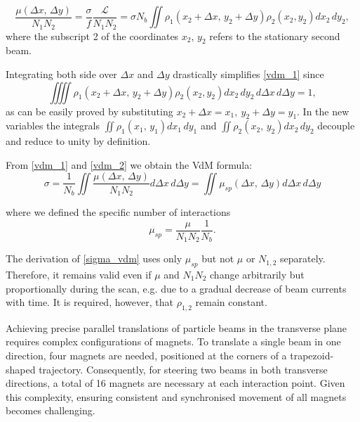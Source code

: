 \begin{equation}
\frac{\mu (\Delta x,\, \Delta y)}{N_1N_2} = \frac{\sigma}{f} \frac{\mathcal{L}}{N_1N_2} = \sigma N_b \iint \rho _1(x_2 + \Delta x,\, y_2 + \Delta y) \rho _2(x_2,y_2) dx_2\, dy_2, \label{vdm_1}
\end{equation}
where the subscript 2 of the coordinates $x_2$, $y_2$ refers to the stationary second beam.

Integrating both side over $\Delta x$ and $\Delta y$ drastically simplifies \eqref{vdm_1} since
\begin{equation} \iiiint \rho _1(x_2 {+} \Delta x,\, y_2 {+} \Delta y) \rho _2(x_2,y_2) dx_2\, dy_2\, d\Delta x\, d\Delta y {=} 1, \label{vdm_2} \end{equation}
as can be easily proved by substituting $x_2+\Delta x=x_1,\ y_2+\Delta y=y_1$. In the new variables the integrals $\iint \rho _1(x_1,\, y_1)dx_1\,dy_1$ and $\iint \rho _2(x_2,\, y_2)dx_2\,dy_2$ decouple and reduce to unity by definition.

From \eqref{vdm_1} and \eqref{vdm_2} we obtain the VdM formula:
\begin{equation}
     \sigma = \frac{1}{N_b} \iint \frac{\mu (\Delta x,\, \Delta y)}{N_1N_2} d\Delta x\, d\Delta y= \iint \mu_{sp}(\Delta x,\, \Delta y)d\Delta x\, d \Delta y \label{sigma_vdm}
    \end{equation}

where we defined the specific number of interactions
\begin{equation}
\mu_{sp}=\frac{\mu}{N_1 N_2}\frac{1}{N_b}.\label{mu_sp}
\end{equation}

The derivation of \eqref{sigma_vdm} uses only $\mu _{sp}$ but not $\mu$ or $N_{1,2}$ separately. Therefore, it remains valid even if $\mu$ and $N_1N_2$ change arbitrarily but proportionally during the scan, e.g. due to a gradual decrease of beam currents with time. It is required, however, that $\rho_{1,2}$ remain constant.

Achieving precise parallel translations of particle beams in the transverse plane requires complex configurations of magnets. To translate a single beam in one direction, four magnets are needed, positioned at the corners of a trapezoid-shaped trajectory. Consequently, for steering two beams in both transverse directions, a total of 16 magnets are necessary at each interaction point. Given this complexity, ensuring consistent and synchronised movement of all magnets becomes challenging.

